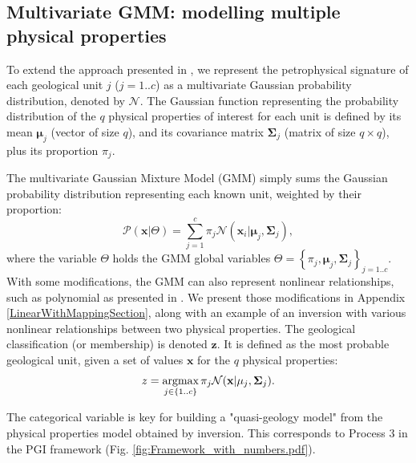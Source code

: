 \documentclass[extra, mreferee]{gji_joint} %
\begin{document}
\subsection{Multivariate GMM: modelling multiple physical properties} \label{PetrophysicsSection}

To extend the approach presented in \citet{ggz389}, we represent the petrophysical signature of each geological unit $j$ ($j=1..c$) as a multivariate Gaussian probability distribution, denoted by $\mathcal{N}$.
The Gaussian function representing the probability distribution of the $q$ physical properties of interest for each unit is defined by its mean $\mathbf{\mu}_j$ (vector of size $q$), and its covariance matrix $\mathbf{\Sigma}_j$ (matrix of size $q\times q$), plus its proportion $\pi_j$.

The multivariate Gaussian Mixture Model (GMM) simply sums the Gaussian probability distribution representing each known unit, weighted by their proportion:
\begin{equation}
\mathcal{P}(\mathbf{x}|\Theta) = \sum_{j=1}^c \pi_j \mathcal{N}(\mathbf{x}_i|\mathbf{\mu}_j, \mathbf{\Sigma}_j) \label{GMM},
\end{equation}
where the variable $\Theta$ holds the GMM global variables $\Theta= \left\{\pi_j, \mathbf{\mu}_j, \mathbf{\Sigma}_j\right\}_{j=1..c}$. With some modifications, the GMM can also represent nonlinear relationships, such as polynomial as presented in \citet{Onizawa2002}. We present those modifications in Appendix \ref{LinearWithMappingSection}, along with an example of an inversion with various nonlinear relationships between two physical properties.
\newpage
The geological classification (or membership) is denoted $\mathbf{z}$. It is defined as the most probable geological unit, given a set of values $\mathbf{x}$ for the $q$ physical properties:
\begin{equation}
z = \mathop{\hbox{argmax}}\limits_{j \in \left\{1..c\right\}} \pi_{j} \mathcal{N}(\mathbf{x}|\mathbf{\mu}_j,\mathbf{\Sigma}_j) \label{eq:MAP_z_physProp}.
\end{equation}

The categorical variable is key for building a "quasi-geology model" \citep{QuasiGeologicalModel} from the physical properties model obtained by inversion. This corresponds to Process $3$ in the PGI framework (Fig. \ref{fig:Framework_with_numbers.pdf}).
\end{document}

